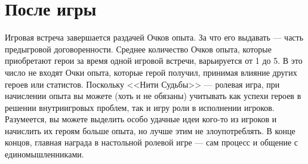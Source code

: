 \section{После игры}
Игровая встреча завершается раздачей Очков опыта. За что его выдавать — часть предыгровой договоренности. Среднее количество Очков опыта, которые приобретают герои за время одной игровой встречи, варьируется от 1 до 5. В это число не входят Очки опыта, которые герой получил, принимая влияние других героев или статистов.
\newline
Поскольку <<Нити Судьбы>> — ролевая игра, при начислении опыта вы можете (хоть и не обязаны) учитывать как успехи героев в решении внутриигровых проблем, так и игру роли в исполнении игроков.
\newline
Разумеется, вы можете выделить особо удачные идеи кого-то из игроков и начислить их героям больше опыта, но лучше этим не злоупотреблять. В конце концов, главная награда в настольной ролевой игре — сам процесс и общение с единомышленниками.